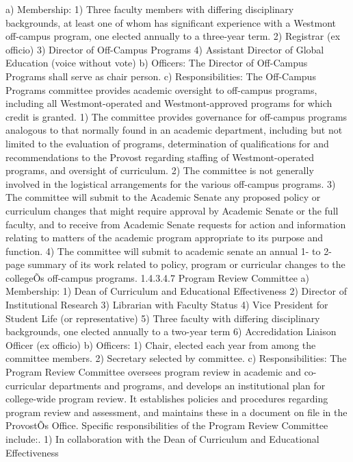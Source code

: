 \documentclass[letterpaper, 11pt]{article}
\begin{document}
			a) Membership:
			1) Three faculty members with differing disciplinary backgrounds, at least one of whom has significant experience with a Westmont off-campus program, one elected annually to a three-year term.
			2)  Registrar (ex officio)
			3) Director of Off-Campus Programs
			4) Assistant Director of Global Education (voice without vote)
			b) Officers:
			The Director of Off-Campus Programs shall serve as chair person.
			c) Responsibilities: The Off-Campus Programs committee provides academic oversight to off-campus programs, including all Westmont-operated and Westmont-approved programs for which credit is granted.
			1) The committee provides governance for off-campus programs analogous to that normally found in an academic department, including but not limited to the evaluation of programs, determination of qualifications for and recommendations to the Provost regarding staffing of Westmont-operated programs, and oversight of curriculum.
			2) The committee is not generally involved in the logistical arrangements for the various off-campus programs.
			3) The committee will submit to the Academic Senate any proposed policy or curriculum changes that might require approval by Academic Senate or the full faculty, and to receive from Academic Senate requests for action and information relating to matters of the academic program appropriate to its purpose and function.
			4) The committee will submit to academic senate an annual 1- to 2- page summary of its work related to policy, program or curricular changes to the collegeÕs off-campus programs.
			1.4.3.4.7 Program Review Committee
			a) Membership:
			1) Dean of Curriculum and Educational Effectiveness
			2) Director of Institutional Research
			3) Librarian with Faculty Status
			4) Vice President for Student Life (or representative)
			5) Three faculty with differing disciplinary backgrounds, one elected annually to a two-year term
			6) Accredidation Liaison Officer (ex officio)
			b) Officers:
			1) Chair, elected each year from among the committee members.
			2) Secretary selected by committee.
			c) Responsibilities:
			The Program Review Committee oversees program review in academic and co-curricular departments and programs, and develops an institutional plan for college-wide program review.  It establishes policies and procedures regarding program review and assessment, and maintains these in a document on file in the ProvostÕs Office.  Specific responsibilities of the Program Review Committee include:.
			1) In collaboration with the Dean of Curriculum and Educational Effectiveness
\end{document}
